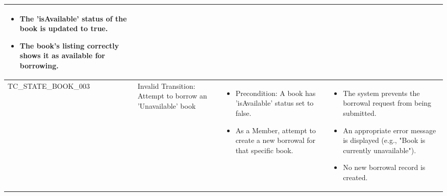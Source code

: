 \documentclass[10pt, a4paper]{report}
\begin{document}
\begin{longtable}{|>{\raggedright\arraybackslash}p{4cm}|>{\raggedright\arraybackslash}p{4cm}|>{\raggedright\arraybackslash}p{4.5cm}|>{\raggedright\arraybackslash}p{4cm}|}
\begin{itemize}[noitemsep, topsep=0pt, partopsep=0pt, leftmargin=*]
        \item The 'isAvailable' status of the book is updated to true.
        \item The book's listing correctly shows it as available for borrowing.
    \end{itemize} \\ \hline
TC\_STATE\_BOOK\_003 & Invalid Transition: Attempt to borrow an 'Unavailable' book & 
    \begin{itemize}[noitemsep, topsep=0pt, partopsep=0pt, leftmargin=*]
        \item Precondition: A book has 'isAvailable' status set to false.
        \item As a Member, attempt to create a new borrowal for that specific book. 
    \end{itemize} & 
    \begin{itemize}[noitemsep, topsep=0pt, partopsep=0pt, leftmargin=*]
        \item The system prevents the borrowal request from being submitted.
        \item An appropriate error message is displayed (e.g., "Book is currently unavailable").
        \item No new borrowal record is created.
    \end{itemize} \\ \hline


\end{longtable}
\end{document}

